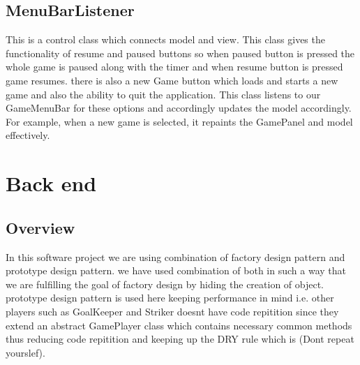 \documentclass[12pt, dvipsnames, a4paper]{article}
\begin{document}
\subsection{MenuBarListener}
This is a control class which connects model and view. This class gives the functionality of resume and paused buttons so when
paused button is pressed the whole game is paused along with the timer and when resume button is pressed game resumes. there is also
a new Game button which loads and starts a new game and also the ability to quit the application. This class
listens to our GameMenuBar for these options and accordingly updates the model accordingly.
For example, when a new game is selected, it repaints the GamePanel and model effectively.
\clearpage

\section{Back end}
\subsection{Overview}
In this software project we are using combination of factory design pattern and prototype design pattern.
we have used combination of both in such a way that we are fulfilling the goal of factory design by hiding the
creation of object. prototype design pattern is used here keeping performance in mind i.e. other players such as
GoalKeeper and Striker doesnt have code repitition since they extend an abstract GamePlayer class which contains
necessary common methods thus reducing code repitition and keeping up the DRY rule which is (Dont repeat yourslef).
\end{document}
